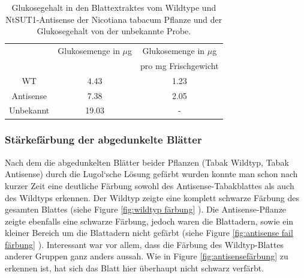 \documentclass[10pt,a4paper]{article}
\begin{document}
		\begin{table}[H]
			\centering
			\begin{tabular}{ccc}
				\toprule
				& Glukosemenge in $\mu$g & Glukosemenge in $\mu$g \\
				&& pro mg Frischgewicht \\ 
				\midrule
				WT & 4.43 & 1.23\\
				Antisense & 7.38 & 2.05\\
				Unbekannt & 19.03 & -\\
				\bottomrule
			\end{tabular}
			\caption{Glukosegehalt in den Blattextraktes vom Wildtype und NtSUT1-Antisense der Nicotiana tabacum Pflanze und der Glukosegehalt von der unbekannte Probe.}
			\label{tab:Glucosegehalt in Tabak}
		\end{table}
		
		\subsubsection{Stärkefärbung der abgedunkelte Blätter}
		Nach dem die abgedunkelten Blätter beider Pflanzen (Tabak Wildtyp, Tabak Antisense) durch die Lugol‘sche Lösung gefärbt wurden konnte man schon nach kurzer Zeit eine deutliche Färbung sowohl des Antisense-Tabakblattes als auch des Wildtyps erkennen. Der Wildtyp zeigte eine komplett schwarze Färbung des gesamten Blattes (siehe Figure \ref{fig:wildtyp färbung} ). Die Antisense-Pflanze zeigte ebenfalls eine schwarze Färbung, jedoch waren die Blattadern, sowie ein kleiner Bereich um die Blattadern nicht gefärbt (siehe Figure \ref{fig:antisense fail färbung} ). Interessant war vor allem, dass die Färbung des Wildtyp-Blattes anderer Gruppen ganz anders aussah. Wie in Figure \ref{fig:antisensefärbung} zu erkennen ist, hat sich das Blatt hier überhaupt nicht schwarz verfärbt. 
		
\end{document}
